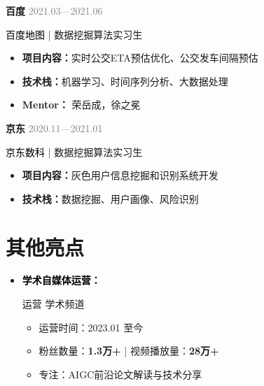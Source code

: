 \documentclass{resume}
\begin{document}
\noindent\textbf{百度}
\hfill \textcolor{gray}{2021.03—2021.06}

\noindent\textcolor{black}{百度地图} | 数据挖掘算法实习生

\begin{itemize}
  \item \textbf{项目内容：}实时公交ETA预估优化、公交发车间隔预估
  \item \textbf{技术栈：}机器学习、时间序列分析、大数据处理
  \item \textbf{Mentor：} 荣岳成，徐之冕
\end{itemize}

\vspace{0.4em}

\noindent\textbf{京东}
\hfill \textcolor{gray}{2020.11—2021.01}

\noindent\textcolor{black}{京东数科} | 数据挖掘算法实习生

\begin{itemize}
  \item \textbf{项目内容：}灰色用户信息挖掘和识别系统开发
  \item \textbf{技术栈：}数据挖掘、用户画像、风险识别
\end{itemize}

\vspace{5pt}


\section{\textbf{其他亮点}}

\begin{itemize}
  \item \textbf{\textcolor{black}{学术自媒体运营：}} 
  
  \quad 运营  学术频道
  
  \begin{itemize}
    \item 运营时间：2023.01 至今
    \item 粉丝数量：\textbf{1.3万+} | 视频播放量：\textbf{28万+}
    \item 专注：AIGC前沿论文解读与技术分享
  \end{itemize}
\end{itemize}
\end{document}
